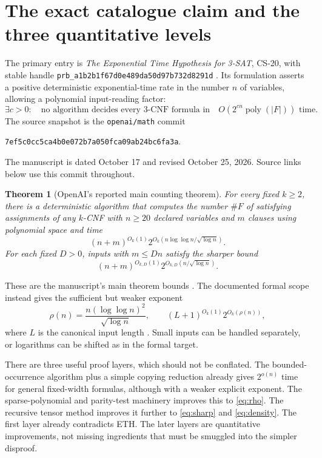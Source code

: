 \documentclass[11pt,a4paper]{article}
\numberwithin{equation}{section}
\newtheorem{theorem}{Theorem}[section]
\theoremstyle{definition}
\theoremstyle{remark}
\newcommand{\poly}{\operatorname{poly}}
\newcommand{\sourcecommit}{7ef5c0cc5ca4b0e072b7a050fca09ab24bc6fa3a}
\newcommand{\pin}{\texttt{\sourcecommit}}
\begin{document}
\section{The exact catalogue claim and the three quantitative levels}
\label{sec:target}
The primary entry is \emph{The Exponential Time Hypothesis for 3-SAT}, CS-20,
with stable handle
\texttt{prb\_a1b2b1f67d0e489da50d97b732d8291d} \cite{catalogue}.
Its formulation asserts a positive deterministic exponential-time rate in the
number $n$ of variables, allowing a polynomial input-reading factor:
\begin{equation}\label{eq:eth}
 \exists c>0:\quad\text{no algorithm decides every $3$-CNF formula in}
 \quad O(2^{cn}\poly(|F|))\text{ time}.
\end{equation}
The source snapshot is the \texttt{openai/math} commit
\begin{center}\pin.\end{center}
The manuscript is dated October 17 and revised October 25, 2026. Source links
below use this commit throughout.

\begin{theorem}[OpenAI's reported main counting theorem]\label{thm:main}
For every fixed $k\ge2$, there is a deterministic algorithm that computes the
number $\#F$ of satisfying assignments of any $k$-CNF with $n\ge20$ declared
variables and $m$ clauses using polynomial space and time
\begin{equation}\label{eq:sharp}
 (n+m)^{O_k(1)}
 2^{O_k(n\log\log n/\sqrt{\log n})}.
\end{equation}
For each fixed $D>0$, inputs with $m\le Dn$ satisfy the sharper bound
\begin{equation}\label{eq:density}
 (n+m)^{O_{k,D}(1)}2^{O_{k,D}(n/\sqrt{\log n})}.
\end{equation}
\end{theorem}
These are the manuscript's main theorem bounds \cite{paper,quant-reduction}.
The documented formal scope instead gives the sufficient but weaker exponent
\begin{equation}\label{eq:rho}
 \rho(n)=\frac{n(\log\log n)^2}{\sqrt{\log n}},\qquad
 (L+1)^{O_k(1)}2^{O_k(\rho(n))},
\end{equation}
where $L$ is the canonical input length \cite{scope}. Small inputs can be
handled separately, or logarithms can be shifted as in the formal target.

There are three useful proof layers, which should not be conflated. The
bounded-occurrence algorithm plus a simple copying reduction already gives
$2^{o(n)}$ time for general fixed-width formulas, although with a weaker
explicit exponent. The sparse-polynomial and parity-test machinery improves
this to \eqref{eq:rho}. The recursive tensor method improves it further to
\eqref{eq:sharp} and \eqref{eq:density}. The first layer already contradicts
ETH. The later layers are quantitative improvements, not missing ingredients
that must be smuggled into the simpler disproof.
\end{document}
